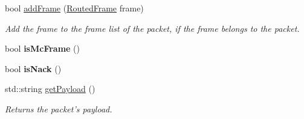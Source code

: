 \begin{DoxyCompactItemize}
\item 
bool \hyperlink{classPacket_a0abfc59341b18a0b3830522fd344579c}{add\-Frame} (\hyperlink{classRoutedFrame}{Routed\-Frame} frame)
\begin{DoxyCompactList}\small\item\em Add the frame to the frame list of the packet, if the frame belongs to the packet. \end{DoxyCompactList}\item 
\hypertarget{classPacket_a365c5a9500b374b8fb3f2c8806523647}{bool {\bfseries is\-Mc\-Frame} ()}\label{classPacket_a365c5a9500b374b8fb3f2c8806523647}

\item 
\hypertarget{classPacket_ae1349ae330ed8943436e24ed7d6d2f02}{bool {\bfseries is\-Nack} ()}\label{classPacket_ae1349ae330ed8943436e24ed7d6d2f02}

\item 
std\-::string \hyperlink{classPacket_aeff54aea0863db044a2948d38895e8aa}{get\-Payload} ()
\begin{DoxyCompactList}\small\item\em Returns the packet's payload. \end{DoxyCompactList}\end{DoxyCompactItemize}
